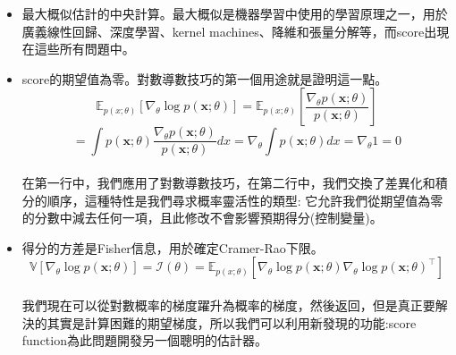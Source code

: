 \documentclass[14pt,a4paper]{report}  %
\begin{document}
\begin{itemize}
\item 最大概似估計的中央計算。最大概似是機器學習中使用的學習原理之一，用於廣義線性回歸、深度學習、kernel machines、降維和張量分解等，而score出現在這些所有問題中。
\end{itemize}
\begin{itemize}
\item  score的期望值為零。對數導數技巧的第一個用途就是證明這一點。\\
$$\mathbb{E}_{p(x; \theta)}[\nabla_\theta \log p(\mathbf{x}; \theta)] =\mathbb{E}_{p(x; \theta)}\left[\frac{\nabla_\theta p(\mathbf {x}; \theta)}{p(\mathbf{x}; \theta)} \right]$$
$$= \int p(\mathbf {x}; \theta) \frac{\nabla_\theta p(\mathbf {x}; \theta)}{p(\mathbf{x}; \theta)} dx= \nabla_\theta \int p(\mathbf{x}; \theta) dx=\nabla_\theta 1 = 0$$\\
\qquad 在第一行中，我們應用了對數導數技巧，在第二行中，我們交換了差異化和積分的順序，這種特性是我們尋求概率靈活性的類型:  它允許我們從期望值為零的分數中減去任何一項，且此修改不會影響預期得分(控制變量)。
\end{itemize}
\begin{itemize}
\item 得分的方差是Fisher信息，用於確定Cramer-Rao下限。\\
$$\mathbb{V}[\nabla_\theta \log p(\mathbf{x}; \theta)] = \mathcal{I}(\theta) =\mathbb{E}_{p(x; \theta)}[\nabla_\theta \log p(\mathbf{x}; \theta)\nabla_\theta \log p(\mathbf{x}; \theta)^\top]$$\\
我們現在可以從對數概率的梯度躍升為概率的梯度，然後返回，但是真正要解決的其實是計算困難的期望梯度，所以我們可以利用新發現的功能:score function為此問題開發另一個聰明的估計器。
\end{itemize}
\end{document}
